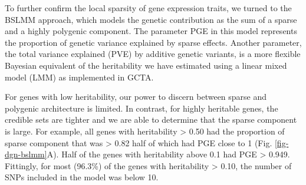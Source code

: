 \documentclass[10pt,letterpaper]{article}
\begin{document}
To further confirm the local sparsity of gene expression traits, we turned to the BSLMM \cite{Zhou_2013} approach, which models the genetic contribution as the sum of a sparse and a highly polygenic component. The parameter PGE in this model represents the proportion of genetic variance explained by sparse effects. Another parameter, the total variance explained (PVE) by additive genetic variants, is a more flexible Bayesian equivalent of the heritability we have estimated using a linear mixed model (LMM) as implemented in GCTA. 

For genes with low heritability, our power to discern between sparse and polygenic architecture is limited. 
In contrast, for highly heritable genes, the credible sets are tighter and we are able to determine that the sparse component is large. For example, all genes with heritability \textgreater{} 0.50 had the proportion of sparse component that was \textgreater{} 0.82 half of which had PGE close to 1 (Fig. \ref{fig-dgn-bslmm}A). Half of the genes with heritability above 0.1 had PGE \textgreater{} 0.949. Fittingly, for most (96.3\%) of the genes with heritability \textgreater{} 0.10, the number of SNPs included in the model was below 10.
\end{document}
